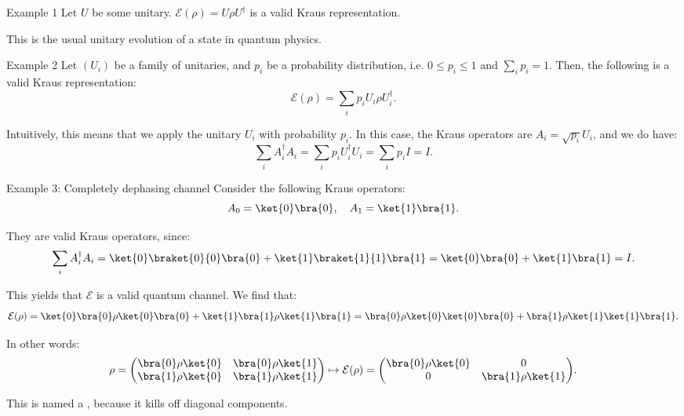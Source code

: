 \documentclass[a4paper]{article}
\begin{document}
\begin{parag}{Example 1}
    Let $U$ be some unitary. $\mathcal{E}\left(\rho\right) = U \rho U^{\dagger}$ is a valid Kraus representation.

    This is the usual unitary evolution of a state in quantum physics.
\end{parag}

\begin{parag}{Example 2}
    Let $\left(U_i\right)$ be a family of unitaries, and $p_i$ be a probability distribution, i.e. $0 \leq p_i \leq 1$ and $\sum_{i} p_i = 1$. Then, the following is a valid Kraus representation: 
    \[\mathcal{E}\left(\rho\right) = \sum_{i} p_i U_i \rho U_i^{\dagger}.\]

    Intuitively, this means that we apply the unitary $U_i$ with probability $p_i$. In this case, the Kraus operators are $A_i = \sqrt{p_i} U_i$, and we do have: 
    \[\sum_{i} A_i^{\dagger} A_i = \sum_{i} p_i U_i^{\dagger} U_i = \sum_{i} p_i I = I.\]
\end{parag}

\begin{parag}{Example 3: Completely dephasing channel}
    Consider the following Kraus operators: 
    \[A_0 = \ket{0}\bra{0}, \mathspace A_1 = \ket{1}\bra{1}.\]

    They are valid Kraus operators, since:
    \[\sum_{i} A_i^{\dagger} A_i = \ket{0} \braket{0}{0} \bra{0} + \ket{1} \braket{1}{1} \bra{1} = \ket{0}\bra{0} + \ket{1}\bra{1} = I.\]

    This yields that $\mathcal{E}$ is a valid quantum channel. We find that: 
    \[\mathcal{E}\left(\rho\right) = \ket{0} \bra{0} \rho \ket{0}\bra{0} + \ket{1}\bra{1} \rho \ket{1}\bra{1} = \bra{0} \rho \ket{0} \ket{0}\bra{0} + \bra{1} \rho \ket{1} \ket{1}\bra{1}.\]

    In other words: 
    \[\rho = \begin{pmatrix} \bra{0} \rho \ket{0} & \bra{0} \rho \ket{1} \\ \bra{1} \rho \ket{0} & \bra{1} \rho \ket{1} \end{pmatrix} \mapsto \mathcal{E}\left(\rho\right) = \begin{pmatrix} \bra{0} \rho \ket{0} & 0 \\ 0 & \bra{1} \rho \ket{1} \end{pmatrix}.\]

    This is named a , because it kills off diagonal components.
\end{parag}
\end{document}
